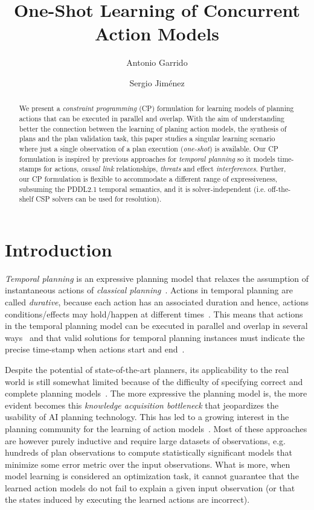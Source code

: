 \documentclass{ecai}
\begin{document}
\title{One-Shot Learning of Concurrent Action Models}
\author{Antonio Garrido \and Sergio Jim\'enez}
 
\maketitle

\begin{abstract}
  We present a {\em constraint programming} (CP) formulation for learning models of planning actions that can be executed in parallel and overlap. With the aim of understanding better the connection between the learning of planing action models, the synthesis of plans and the plan validation task, this paper studies a singular learning scenario where just a single observation of a plan execution ({\em one-shot}) is available. Our CP formulation is inspired by previous approaches for {\em temporal planning} so it models time-stamps for actions, {\em causal link} relationships, {\em threats} and effect {\em interferences}. Further, our CP formulation is flexible to accommodate a different range of expressiveness, subsuming the PDDL2.1 temporal semantics, and it is solver-independent (i.e. off-the-shelf CSP solvers can be used for resolution).   
\end{abstract}


\section{Introduction}
{\em Temporal planning} is an expressive planning model that relaxes the assumption of instantaneous actions of {\em classical planning}~\cite{geffner2013concise}. Actions in temporal planning are called {\em durative}, because each action has an associated duration and hence, actions conditions/effects may hold/happen at different times~\cite{fox2003pddl2}. This means that actions in the temporal planning model can be executed in parallel and overlap in several ways~\cite{cushing2007temporal} and that valid solutions for temporal planning instances must indicate the precise time-stamp when actions start and end~\cite{howey2004val}.

Despite the potential of state-of-the-art planners, its applicability to the real world is still somewhat limited because of the difficulty of specifying correct and complete planning models~\cite{kambhampati2007model}. The more expressive the planning model is, the more evident becomes this {\em knowledge acquisition bottleneck} that jeopardizes the usability of AI planning technology. This has led to a growing interest in the planning community for the learning of action models~\cite{yang2007learning,MouraoZPS12,zhuo2013action,kuvcera2018louga}. Most of these approaches are however purely inductive and require large datasets of observations, e.g. hundreds of plan observations to compute statistically significant models that minimize some error metric over the input observations. What is more, when model learning is considered an optimization task, it cannot guarantee that the learned action models do not fail to explain a given input observation (or that the states induced by executing the learned actions are incorrect).
\end{document}
